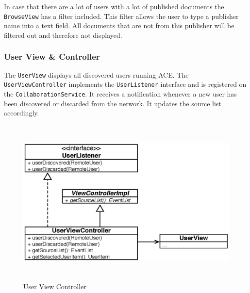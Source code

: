 
In case that there are a lot of users with a lot of published documents the \texttt{Browse\-View} has a filter included. This filter allows the user to type a publisher name into a text field. All documents that are not from this publisher will be filtered out and therefore not displayed.


\subsubsection{User View \& Controller}
The \texttt{User\-View} displays all discovered users running ACE. The \texttt{User\-View\-Controller} implements the \texttt{User\-Listener} interface and is registered on the \texttt{Collaboration\-Service}. It receives a notification whenever a new user has been discovered or discarded from the network. It updates the source list accordingly. 

\begin{figure}[H]
\begin{center}
  \includegraphics[height=3.33in, width=5.62in]{../images/finalreport/application_userview.eps}
\caption{User View Controller}
\label{application_userview}
\end{center}
\end{figure}

